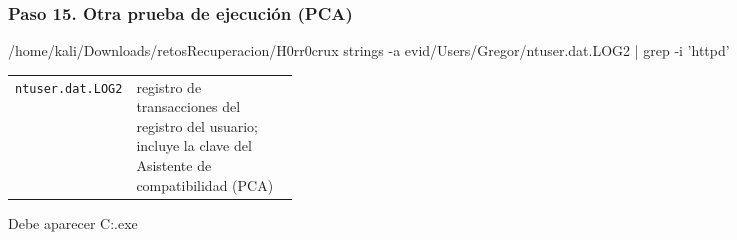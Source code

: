 \documentclass[11pt,a4paper]{article}
\begin{document}
\subsubsection*{Paso 15. Otra prueba de ejecución (PCA)}
\begin{comando}{/home/kali/Downloads/retosRecuperacion/H0rr0crux}
strings -a evid/Users/Gregor/ntuser.dat.LOG2 | grep -i 'httpd'
\end{comando}
\begin{tcolorbox}[enhanced, breakable, colback=gray!3, colframe=gray!35, boxrule=0.3pt, arc=1pt, left=4pt, right=4pt, top=2pt, bottom=2pt, fonttitle=\sffamily\scriptsize\bfseries, coltitle=black!70, colbacktitle=gray!10, title={Qué hace cada parte}, attach title to upper, before skip=2pt, after skip=4pt, fontupper=\small]
\par{\renewcommand{\arraystretch}{1.12}\begin{tabularx}{\linewidth}{@{}>{\raggedright\arraybackslash}p{0.33\linewidth}>{\raggedright\arraybackslash}X@{}}
\texttt{ntuser.dat.LOG2} & registro de transacciones del registro del usuario; incluye la clave del Asistente de compatibilidad (PCA) \\
\end{tabularx}}
\end{tcolorbox}
\begin{salida}{Debe aparecer}
C:\Users\Gregor\AppData\Roaming\Microsoft\Windows\httpd.exe
\end{salida}
\end{document}
